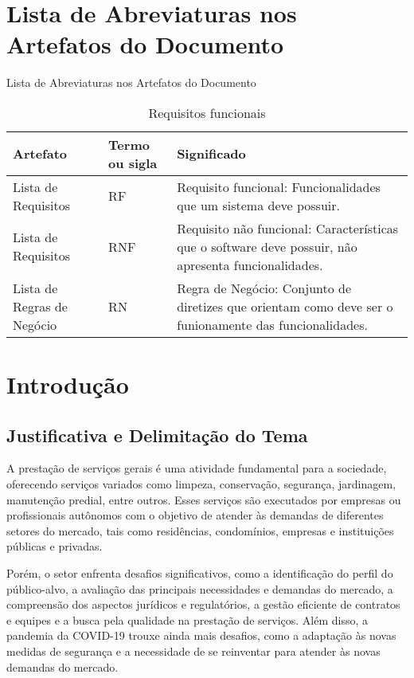 \chapter{Lista de Abreviaturas nos Artefatos do Documento}
Lista de Abreviaturas nos Artefatos do Documento
\begin{table}[htb]
	\centering
	\caption{\label{Formatação do texto.}Requisitos funcionais}	
	\begin{tabular}{|p{4cm}|m{3cm}|p{7cm}|}
		\hline
		\textbf{Artefato} & \textbf{Termo ou sigla} & \textbf{Significado} \\ \hline
		Lista de Requisitos & RF & Requisito funcional: Funcionalidades que um sistema deve possuir. \\ \hline
		Lista de Requisitos & RNF & Requisito não funcional: Características que o software deve possuir, não apresenta funcionalidades. \\ \hline
		Lista de Regras de Negócio & RN & Regra de Negócio: Conjunto de diretizes que orientam como deve ser o funionamente das funcionalidades. \\ \hline
	\end{tabular}
\end{table}
\chapter{Introdução}


\section{Justificativa e Delimitação do Tema}

A prestação de serviços gerais é uma atividade fundamental para a sociedade, oferecendo serviços variados como limpeza, conservação, segurança, jardinagem, manutenção predial, entre outros. Esses serviços são executados por empresas ou profissionais autônomos com o objetivo de atender às demandas de diferentes setores do mercado, tais como residências, condomínios, empresas e instituições públicas e privadas.

Porém, o setor enfrenta desafios significativos, como a identificação do perfil do público-alvo, a avaliação das principais necessidades e demandas do mercado, a compreensão dos aspectos jurídicos e regulatórios, a gestão eficiente de contratos e equipes e a busca pela qualidade na prestação de serviços. Além disso, a pandemia da COVID-19 trouxe ainda mais desafios, como a adaptação às novas medidas de segurança e a necessidade de se reinventar para atender às novas demandas do mercado.


